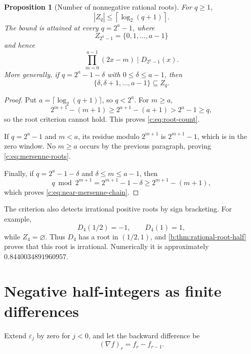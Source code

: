 \documentclass[11pt,a4paper,oneside,openany]{book}
\numberwithin{equation}{chapter}
\newtheorem{proposition}[theorem]{Proposition}
\theoremstyle{definition}
\theoremstyle{remark}
\newcommand{\eps}{\varepsilon}
\newcommand{\Diag}{D}
\begin{document}
\begin{proposition}[Number of nonnegative rational roots]
For \(q\geq1\),
\begin{equation}
 |Z_q|\leq\left\lceil\log_2(q+1)\right\rceil.              \label{c:eq:root-count}
\end{equation}
The bound is attained at every \(q=2^a-1\), where
\begin{equation}
 Z_{2^a-1}=\{0,1,\ldots,a-1\}                              \label{c:eq:mersenne-roots}
\end{equation}
and hence
\begin{equation}
 \prod_{m=0}^{a-1}(2x-m)\mid\Diag_{2^a-1}(x).              \label{c:eq:mersenne-factor}
\end{equation}
More generally, if
\(q=2^a-1-\delta\) with \(0\leq\delta\leq a-1\), then
\begin{equation}
 \{\delta,\delta+1,\ldots,a-1\}\subseteq Z_q.             \label{c:eq:near-mersenne-chain}
\end{equation}
\end{proposition}

\begin{proof}
Put \(a=\lceil\log_2(q+1)\rceil\), so \(q<2^a\).  For
\(m\geq a\),
\[
 2^{m+1}-(m+1)\geq2^{a+1}-(a+1)>2^a-1\geq q,
\]
so the root criterion cannot hold.  This proves \cref{c:eq:root-count}.

If \(q=2^a-1\) and \(m<a\), its residue modulo \(2^{m+1}\) is
\(2^{m+1}-1\), which is in the zero window.  No \(m\geq a\) occurs by the
previous paragraph, proving \cref{c:eq:mersenne-roots}.

Finally, if \(q=2^a-1-\delta\) and
\(\delta\leq m\leq a-1\), then
\[
 q\bmod2^{m+1}=2^{m+1}-1-\delta
 \geq2^{m+1}-(m+1),
\]
which proves \cref{c:eq:near-mersenne-chain}.
\end{proof}
The criterion also detects irrational positive roots by sign bracketing.  For
example,
\[
 \Diag_4(1/2)=-1,
 \qquad
 \Diag_4(1)=1,
\]
while \(Z_4=\varnothing\).  Thus \(\Diag_4\) has a root in
\((1/2,1)\), and \cref{b:thm:rational-root-half} proves that this root is
irrational.  Numerically it is approximately
\(0.8440034891960957\).
\section{Negative half-integers as finite differences}

Extend \(\eps_j\) by zero for \(j<0\), and let the backward difference be
\begin{equation}
 (\nabla f)_r=f_r-f_{r-1}.
 \label{a:eq:backward-difference}
\end{equation}
\end{document}
